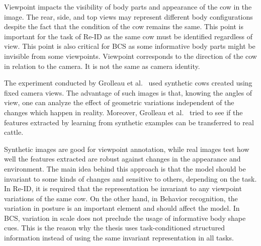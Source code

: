 Viewpoint impacts the visibility of body parts and appearance of the cow in the image. The rear, side, and top views may represent different body configurations despite the fact that the condition of the cow remains the same. This point is important for the task of Re-ID as the same cow must be identified regardless of view. This point is also critical for BCS as some informative body parts might be invisible from some viewpoints. Viewpoint corresponds to the direction of the cow in relation to the camera. It is not the same as camera identity.

The experiment conducted by Grolleau et al.~\cite{grolleau2026moo} used synthetic cows created using fixed camera views. The advantage of such images is that, knowing the angles of view, one can analyze the effect of geometric variations independent of the changes which happen in reality. Moreover, Grolleau et al.~\cite{grolleau2026moo} tried to see if the features extracted by learning from synthetic examples can be transferred to real cattle.

Synthetic images are good for viewpoint annotation, while real images test how well the features extracted are robust against changes in the appearance and environment. The main idea behind this approach is that the model should be invariant to some kinds of changes and sensitive to others, depending on the task. In Re-ID, it is required that the representation be invariant to any viewpoint variations of the same cow. On the other hand, in Behavior recognition, the variation in posture is an important element and should affect the model. In BCS, variation in scale does not preclude the usage of informative body shape cues. This is the reason why the thesis uses task-conditioned structured information instead of using the same invariant representation in all tasks.

